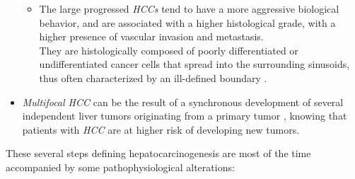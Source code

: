 \documentclass[]{article}
\begin{document}
\begin{itemize}
\begin{itemize}
  \item The large progressed \emph{HCCs} tend to have a more aggressive
    biological behavior, and are associated with a higher histological
    grade, with a higher presence of vascular invasion and metastasis.\\
    They are histologically composed of poorly differentiated or
    undifferentiated cancer cells that spread into the surrounding
    sinusoids, thus often characterized by an ill-defined boundary \cite{Kudo2010,Beasley1981,ElSerag2011,Baffy2012,McGlynn2011,Tyson2011, Theise2006, Trevisani2008a}.
  \end{itemize}
\item \emph{Multifocal HCC} can be the result of a synchronous development
  of several independent liver tumors originating from a primary tumor \cite{Trevisani2008a}, knowing that patients with
  \emph{HCC} are at higher risk of developing new tumors.
\end{itemize}

These several steps defining hepatocarcinogenesis are most of the time
accompanied by some pathophysiological alterations:
\end{document}
